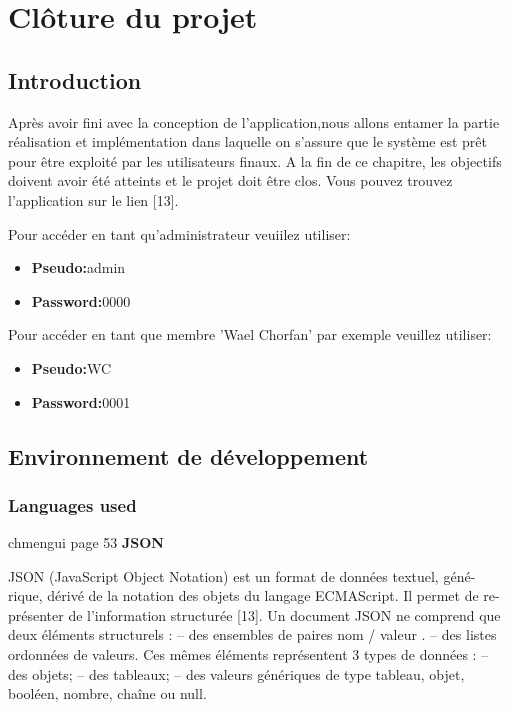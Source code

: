 \chapter{ Cl\^{o}ture du projet }
\section{Introduction}

Apr\`{e}s avoir fini avec la conception de l'application,nous allons entamer la
partie r\'{e}alisation et impl\'{e}mentation dans laquelle on s'assure que le
syst\`{e}me est pr\^{e}t pour \^{e}tre exploit\'{e} par les utilisateurs finaux.
A la fin de ce chapitre, les objectifs doivent avoir \'{e}t\'{e} atteints et le projet doit
\^{e}tre clos.
Vous pouvez trouvez l'application sur le lien [13].


  Pour acc\'{e}der en tant qu'administrateur veuiilez utiliser:

  \begin{itemize}
    \item {\textbf{ Pseudo:}admin}
    \item {\textbf{ Password:}0000}
  \end{itemize}


  Pour acc\'{e}der en tant que membre 'Wael Chorfan' par exemple veuillez utiliser:

  \begin{itemize}
    \item {\textbf{ Pseudo:}WC}
    \item {\textbf{ Password:}0001}
  \end{itemize}

 \newpage

\section{Environnement de d\'{e}veloppement}


  \subsection{Languages used}


  chmengui page 53
  \textbf{JSON}\newline

JSON (JavaScript Object Notation) est un format de données textuel, géné-
rique, dérivé de la notation des objets du langage ECMAScript. Il permet de re-
présenter de l’information structurée [13]. Un document JSON ne comprend que
deux éléments structurels :
– des ensembles de paires nom / valeur .
– des listes ordonnées de valeurs.
Ces mêmes éléments représentent 3 types de données :
– des objets;
– des tableaux;
– des valeurs génériques de type tableau, objet, booléen, nombre, chaîne ou
null.


